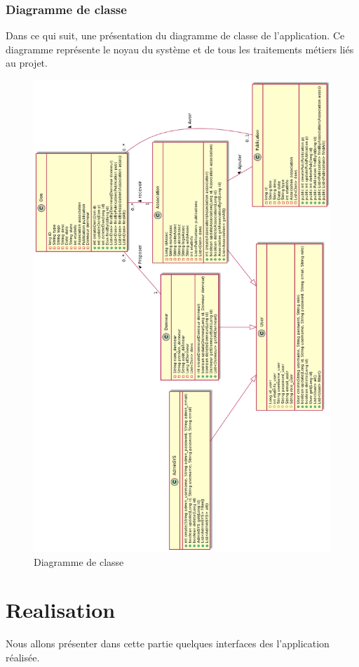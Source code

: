 \subsection{Diagramme de classe}
Dans ce qui suit, une présentation du diagramme de classe de l’application. Ce diagramme représente le noyau du système et de tous les traitements métiers liés au projet.


\begin{figure}[!h]
\begin{center}
\includegraphics[width=14cm]{DCL.png}
\caption{Diagramme de classe}
\end{center}
\end{figure}
\chapter{Realisation}
Nous allons présenter dans cette partie quelques interfaces des l’application réalisée.


